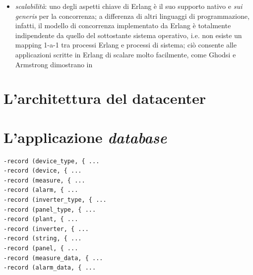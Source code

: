 \begin{itemize}
      delle strategie di recupero, e, quindi, per creare sistemi caratterizzati 
      da un elevato grado di \emph{reliability} e \emph{fault tolerance}\cite{armstrongreliability}
%
\item \emph{scalabilit\`a}: uno degli aspetti chiave di Erlang \`e il suo supporto nativo 
      e \emph{sui generis} per la concorrenza; a differenza di altri linguaggi di programmazione, 
      infatti, il modello di concorrenza  implementato da Erlang \`e totalmente indipendente da 
      quello del sottostante sistema operativo, i.e. non esiste un mapping 1-a-1 tra processi 
      Erlang e processi di sistema; ci\`o consente alle applicazioni scritte in Erlang di 
      scalare molto facilmente, come Ghodsi e Armstrong dimostrano in \cite{armstrongyaws}
\end{itemize}
%















\section{L'architettura del datacenter}
\label{datacenter-arch}
%
\section{L'applicazione \emph{database}}
%
\begin{lstlisting}[caption={Record per interfacciamento con il database}, label={code:database-record},frame=trBL]
-record (device_type, { ...
-record (device, { ...
-record (measure, { ...
-record (alarm, { ...
-record (inverter_type, { ...
-record (panel_type, { ...
-record (plant, { ...
-record (inverter, { ...
-record (string, { ...
-record (panel, { ...
-record (measure_data, { ...
-record (alarm_data, { ...
\end{lstlisting}
%

